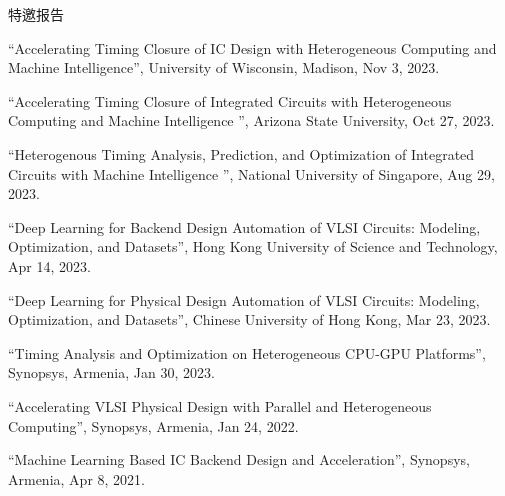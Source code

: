\begin{rSection}{特邀报告}
\begin{description}[font=\normalfont]
\item[{[8]}]{
``Accelerating Timing Closure of IC Design with Heterogeneous Computing and Machine Intelligence'', University of Wisconsin, Madison, Nov 3, 2023. 
}

\item[{[7]}]{
``Accelerating Timing Closure of Integrated Circuits with Heterogeneous Computing and Machine Intelligence '', Arizona State University, Oct 27, 2023. 
}

\item[{[6]}]{
``Heterogenous Timing Analysis, Prediction, and Optimization of Integrated Circuits with Machine Intelligence '', National University of Singapore, Aug 29, 2023. 
}

\item[{[5]}]{
``Deep Learning for Backend Design Automation of VLSI Circuits: Modeling, Optimization, and Datasets'', Hong Kong University of Science and Technology, Apr 14, 2023. 
}

\item[{[4]}]{
``Deep Learning for Physical Design Automation of VLSI Circuits: Modeling, Optimization, and Datasets'', Chinese University of Hong Kong, Mar 23, 2023. 
}

\item[{[3]}]{
``Timing Analysis and Optimization on Heterogeneous CPU-GPU Platforms'', Synopsys, Armenia, Jan 30, 2023. 
}

\item[{[2]}]{
``Accelerating VLSI Physical Design with Parallel and Heterogeneous Computing'', Synopsys, Armenia, Jan 24, 2022. 
}

\item[{[1]}]{
``Machine Learning Based IC Backend Design and Acceleration'', Synopsys, Armenia, Apr 8, 2021. 
}

\end{description}

\end{rSection}

